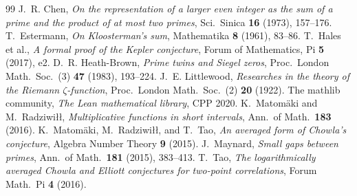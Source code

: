 \documentclass{CUP-JNL-FMP}
\theoremstyle{remark}
\begin{document}
\begin{thebibliography}{99}
 J.~R. Chen, \emph{On the representation of a larger
even integer as the sum of a prime and the product of at most two primes},
Sci.\ Sinica \textbf{16} (1973), 157--176.
 T.~Estermann, \emph{On Kloosterman's sum},
Mathematika \textbf{8} (1961), 83--86.
 T.~Hales et al., \emph{A formal proof of the Kepler
conjecture}, Forum of Mathematics, Pi \textbf{5} (2017), e2.
 D.~R. Heath-Brown, \emph{Prime twins and Siegel zeros},
Proc.\ London Math.\ Soc.\ (3) \textbf{47} (1983), 193--224.
 J.~E. Littlewood, \emph{Researches in the theory
of the Riemann $\zeta$-function}, Proc.\ London Math.\ Soc.\ (2)
\textbf{20} (1922).
 The mathlib community, \emph{The Lean mathematical
library}, CPP 2020.
 K.~Matom\"aki and M.~Radziwi\l\l, \emph{Multiplicative
functions in short intervals}, Ann.\ of Math.\ \textbf{183} (2016).
 K.~Matom\"aki, M.~Radziwi\l\l, and T.~Tao, \emph{An
averaged form of Chowla's conjecture}, Algebra Number Theory \textbf{9}
(2015).
 J.~Maynard, \emph{Small gaps between primes},
Ann.\ of Math.\ \textbf{181} (2015), 383--413.
 T.~Tao, \emph{The logarithmically averaged Chowla and
Elliott conjectures for two-point correlations}, Forum Math.\ Pi
\textbf{4} (2016).
\end{thebibliography}
\end{document}
